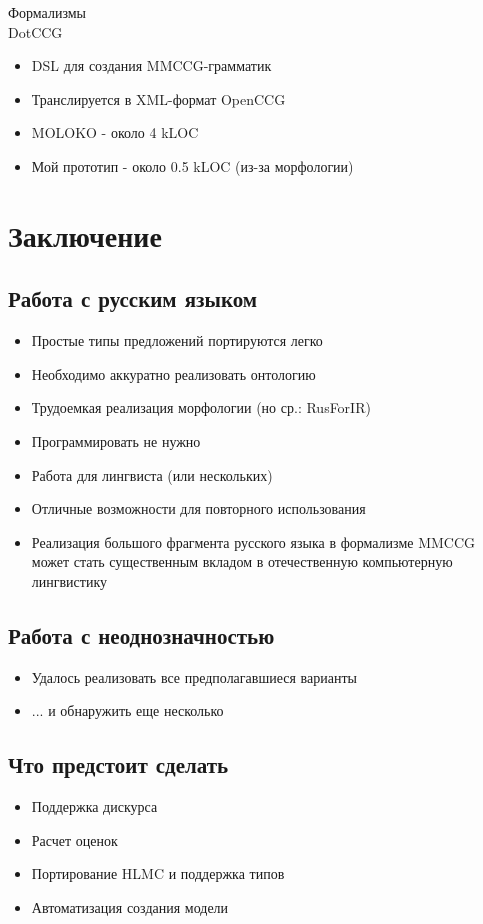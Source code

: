 \documentclass[a4paper,12pt]{article}
\begin{document}
Формализмы\\
DotCCG
\begin{itemize}
	\item DSL для создания MMCCG-грамматик
	\item Транслируется в XML-формат OpenCCG
	\item MOLOKO - около 4 kLOC 
	\item Мой прототип - около 0.5 kLOC (из-за морфологии)
\end{itemize}





\section{Заключение}

\subsection{Работа с русским языком}
\begin{itemize}
	\item Простые типы предложений портируются легко
	\item Необходимо аккуратно реализовать онтологию
	\item Трудоемкая реализация морфологии (но ср.: RusForIR)
	\item Программировать не нужно
	\item Работа для лингвиста (или нескольких)
	\item Отличные возможности для повторного использования
	\item Реализация большого фрагмента русского языка в формализме MMCCG 
может стать существенным вкладом в отечественную компьютерную лингвистику
\end{itemize}

\subsection{Работа с неоднозначностью}
\begin{itemize}
	\item Удалось реализовать все предполагавшиеся варианты
	\item ... и обнаружить еще несколько
\end{itemize}

\subsection{Что предстоит сделать}
\begin{itemize}
	\item Поддержка дискурса
	\item Расчет оценок
	\item Портирование HLMC и поддержка типов
	\item Автоматизация создания модели
\end{itemize}
\end{document}
